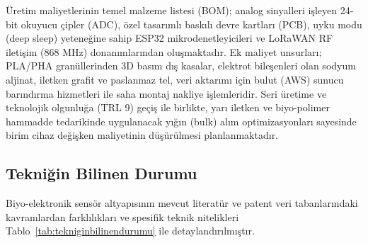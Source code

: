 \documentclass[11pt,a4paper]{article}
\begin{document}
Üretim maliyetlerinin temel malzeme listesi (BOM); analog sinyalleri işleyen 24-bit okuyucu çipler (ADC), özel tasarımlı baskılı devre kartları (PCB), uyku modu (deep sleep) yeteneğine sahip ESP32 mikrodenetleyicileri ve LoRaWAN RF iletişim (868 MHz) donanımlarından oluşmaktadır. Ek maliyet unsurları; PLA/PHA granüllerinden 3D basım dış kasalar, elektrot bileşenleri olan sodyum aljinat, iletken grafit ve paslanmaz tel, veri aktarımı için bulut (AWS) sunucu barındırma hizmetleri ile saha montaj nakliye işlemleridir. Seri üretime ve teknolojik olgunluğa (TRL 9) geçiş ile birlikte, yarı iletken ve biyo-polimer hammadde tedarikinde uygulanacak yığın (bulk) alım optimizasyonları sayesinde birim cihaz değişken maliyetinin düşürülmesi planlanmaktadır.

\subsection{Tekniğin Bilinen Durumu}

Biyo-elektronik sensör altyapısının mevcut literatür ve patent veri tabanlarındaki kavramlardan farklılıkları ve spesifik teknik nitelikleri Tablo~\ref{tab:tekniginbilinendurumu} ile detaylandırılmıştır.
\end{document}
